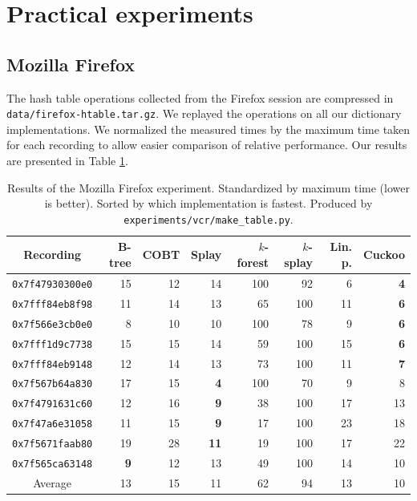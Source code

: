 \section{Practical experiments}
\subsection{Mozilla Firefox}
The hash table operations collected from the Firefox session are compressed
in \texttt{data/firefox-htable.tar.gz}. We replayed the operations on all our
dictionary implementations. We normalized the measured times by the maximum
time taken for each recording to allow easier comparison of relative
performance. Our results are presented in Table \ref{tab:firefox-results}.

\begin{table}
\centering
\begin{tabular}{|c|r|r|r|r|r|r|r|}
	\hline
	Recording &
		B-tree & COBT &
		Splay & $k$-forest & $k$-splay &
		Lin. p. & Cuckoo \\
	\hline
	\texttt{0x7f47930300e0} & 15 & 12 & 14 & 100 & 92 & 6 & \textbf{4} \\
	\hline
	\texttt{0x7fff84eb8f98} & 11 & 14 & 13 & 65 & 100 & 11 & \textbf{6} \\
	\hline
	\texttt{0x7f566e3cb0e0} & 8 & 10 & 10 & 100 & 78 & 9 & \textbf{6} \\
	\hline
	\texttt{0x7fff1d9c7738} & 15 & 15 & 14 & 59 & 100 & 15 & \textbf{6} \\
	\hline
	\texttt{0x7fff84eb9148} & 12 & 14 & 13 & 73 & 100 & 11 & \textbf{7} \\
	\hline
	\texttt{0x7f567b64a830} & 17 & 15 & \textbf{4} & 100 & 70 & 9 & 8 \\
	\hline
	\texttt{0x7f4791631c60} & 12 & 16 & \textbf{9} & 38 & 100 & 17 & 13 \\
	\hline
	\texttt{0x7f47a6e31058} & 11 & 15 & \textbf{9} & 17 & 100 & 23 & 18 \\
	\hline
	\texttt{0x7f5671faab80} & 19 & 28 & \textbf{11} & 19 & 100 & 17 & 22 \\
	\hline
	\texttt{0x7f565ca63148} & \textbf{9} & 12 & 13 & 49 & 100 & 14 & 10 \\
	\hline
	\hline
	Average & 13 & 15 & 11 & 62 & 94 & 13 & 10 \\
	\hline
\end{tabular}
\caption{Results of the Mozilla Firefox experiment. Standardized by maximum
	time (lower is better). Sorted by which implementation is fastest.
	Produced by \texttt{experiments/vcr/make\_table.py}.}
\label{tab:firefox-results}
\end{table}

